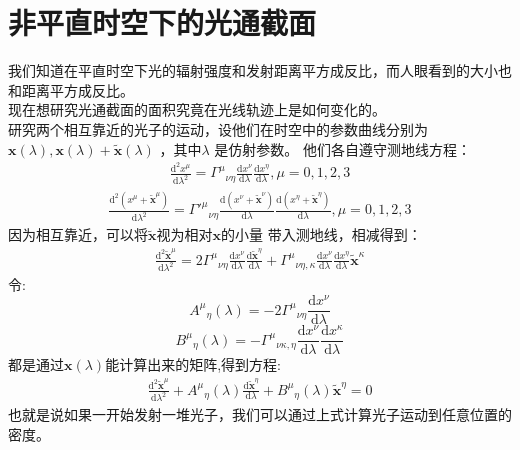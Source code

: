 \documentclass[a4paper, 12pt]{article}
\begin{document}
    \section{非平直时空下的光通截面}
    我们知道在平直时空下光的辐射强度和发射距离平方成反比，而人眼看到的大小也和距离平方成反比。\\
    现在想研究光通截面的面积究竟在光线轨迹上是如何变化的。\\
    研究两个相互靠近的光子的运动，设他们在时空中的参数曲线分别为$\mathbf x(\lambda),\mathbf x(\lambda)+\widetilde {\mathbf x}(\lambda) $   ，其中$\lambda$ 是仿射参数。
    他们各自遵守测地线方程：
    \begin{align*}
        \frac{\mathrm d^2 x^{\mu}}{\mathrm d \lambda ^2} = {\Gamma^{\mu}}_{\nu\eta}\frac{\mathrm d x^{\nu}}{\mathrm d \lambda}\frac{\mathrm d x^{\eta}}{\mathrm d \lambda} ,\mu = 0,1,2,3 
    \end{align*}
    \begin{align*}
        \frac{\mathrm d^2 (x^{\mu}+\widetilde{\mathbf x}^{\mu})}{\mathrm d \lambda ^2} = {\Gamma'^{\mu}}_{\nu\eta}\frac{\mathrm d (x^{\nu}+\widetilde{\mathbf x}^{\nu})}{\mathrm d \lambda}\frac{\mathrm d (x^{\eta}+\widetilde{\mathbf x}^{\eta})}{\mathrm d \lambda} ,\mu = 0,1,2,3 
    \end{align*}
    因为相互靠近，可以将$\widetilde{\mathbf x}$视为相对$\mathbf x$的小量
    带入测地线，相减得到：
    \begin{align*}
        \frac{\mathrm d^2 \widetilde{\mathbf x}^{\mu}}{\mathrm d\lambda ^2} = 2{\Gamma ^{\mu}}_{\nu\eta}\frac{\mathrm d x^{\nu}}{\mathrm d\lambda}\frac{\mathrm d \widetilde{\mathbf x}^\eta}{\mathrm d\lambda}  
        +{\Gamma ^{\mu}}_{\nu\eta,\kappa}\frac{\mathrm d x^{\nu}}{\mathrm d \lambda}\frac{\mathrm d x^{\eta}}{\mathrm d \lambda}\widetilde{\mathbf x}^{\kappa}
    \end{align*}
    令:
    \[{A^{\mu}}_{\eta}(\lambda) = -2{\Gamma ^{\mu}}_{\nu\eta}\frac{\mathrm d x^{\nu}}{\mathrm d\lambda}\]
    \[{B^{\mu}}_{\eta}(\lambda) = -{\Gamma ^{\mu}}_{\nu\kappa,\eta}\frac{\mathrm d x^{\nu}}{\mathrm d \lambda}\frac{\mathrm d x^{\kappa}}{\mathrm d \lambda}\]
    都是通过$\mathbf x(\lambda)$能计算出来的矩阵,得到方程:
    \begin{align*}
        \frac{\mathrm d^2 \widetilde{\mathbf x}^{\mu}}{\mathrm d\lambda ^2} +{A^{\mu}}_{\eta}(\lambda)\frac{\mathrm d \widetilde{\mathbf x}^\eta}{\mathrm d\lambda} +{B^{\mu}}_{\eta}(\lambda)\widetilde{\mathbf x}^\eta = 0
    \end{align*}
    也就是说如果一开始发射一堆光子，我们可以通过上式计算光子运动到任意位置的密度。
    
\end{document}
